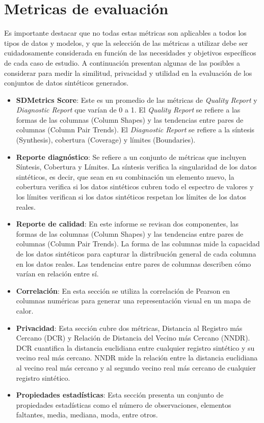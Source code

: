 \section{Metricas de evaluación}
Es importante destacar que no todas estas métricas son aplicables a todos los tipos de datos y modelos, y que la selección de las métricas a utilizar debe ser cuidadosamente considerada en función de las necesidades y objetivos específicos de cada caso de estudio.
A continuación presentan algunas de las posibles a considerar para medir la similitud, privacidad y utilidad en la evaluación de los conjuntos de datos sintéticos generados.
\begin{itemize}
\item \textbf{SDMetrics Score}: Este es un promedio de las métricas de \emph{Quality Report} y \emph{Diagnostic Report} que varían de 0 a 1. El \emph{Quality Report} se refiere a las formas de las columnas (Column Shapes) y las tendencias entre pares de columnas (Column Pair Trends). El \emph{Diagnostic Report} se refiere a la síntesis (Synthesis), cobertura (Coverage) y límites (Boundaries).
\item \textbf{Reporte diagnóstico}: Se refiere a un conjunto de métricas que incluyen Síntesis, Cobertura y Límites. La síntesis verifica la singularidad de los datos sintéticos, es decir, que sean en su combinación un elemento nuevo, la cobertura verifica si los datos sintéticos cubren todo el espectro de valores y los límites verifican si los datos sintéticos respetan los límites de los datos reales.
\item \textbf{Reporte de calidad}: En este informe se revisan dos componentes, las formas de las columnas (Column Shapes) y las tendencias entre pares de columnas (Column Pair Trends). La forma de las columnas mide la capacidad de los datos sintéticos para capturar la distribución general de cada columna en los datos reales. Las tendencias entre pares de columnas describen cómo varían en relación entre sí.
\item \textbf{Correlación}: En esta sección se utiliza la correlación de Pearson en columnas numéricas para generar una representación visual en un mapa de calor.
\item \textbf{Privacidad}: Esta sección cubre dos métricas, Distancia al Registro más Cercano (DCR) y Relación de Distancia del Vecino más Cercano (NNDR). DCR cuantifica la distancia euclidiana entre cualquier registro sintético y su vecino real más cercano. NNDR mide la relación entre la distancia euclidiana al vecino real más cercano y al segundo vecino real más cercano de cualquier registro sintético.
\item \textbf{Propiedades estadísticas}: Esta sección presenta un conjunto de propiedades estadísticas como el número de observaciones, elementos faltantes, media, mediana, moda, entre otros.
\end{itemize}





